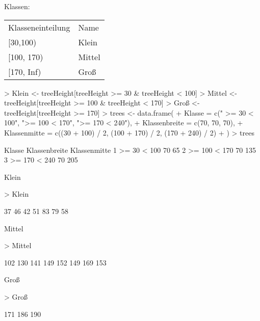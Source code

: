 \documentclass{article}
\begin{document}
Klassen:

\begin{table}[htb]
\begin{tabular}{ll}
Klasseneinteilung & Name\\
{[}30,100)        & Klein\\
{[}100, 170)      & Mittel\\
{[}170, Inf)      & Groß
\end{tabular}
\end{table}

\begin{Schunk}
\begin{Sinput}
> Klein <- treeHeight[treeHeight >= 30 & treeHeight < 100]
> Mittel <- treeHeight[treeHeight >= 100 & treeHeight < 170]
> Groß <- treeHeight[treeHeight >= 170]
> trees <- data.frame(
+   Klasse = c(" >= 30 < 100", ">= 100 < 170", ">= 170 < 240"),
+   Klassenbreite = c(70, 70, 70),
+   Klassenmitte = c((30 + 100) / 2, (100 + 170) / 2, (170 + 240) / 2)
+ )
> trees
\end{Sinput}
\begin{Soutput}
        Klasse Klassenbreite Klassenmitte
1  >= 30 < 100            70           65
2 >= 100 < 170            70          135
3 >= 170 < 240            70          205
\end{Soutput}
\end{Schunk}

Klein 

\begin{Schunk}
\begin{Sinput}
> Klein
\end{Sinput}
\begin{Soutput}
[1] 37 46 42 51 83 79 58
\end{Soutput}
\end{Schunk}

Mittel

\begin{Schunk}
\begin{Sinput}
> Mittel
\end{Sinput}
\begin{Soutput}
[1] 102 130 141 149 152 149 169 153
\end{Soutput}
\end{Schunk}

Groß

\begin{Schunk}
\begin{Sinput}
> Groß
\end{Sinput}
\begin{Soutput}
[1] 171 186 190
\end{Soutput}
\end{Schunk}
\end{document}
